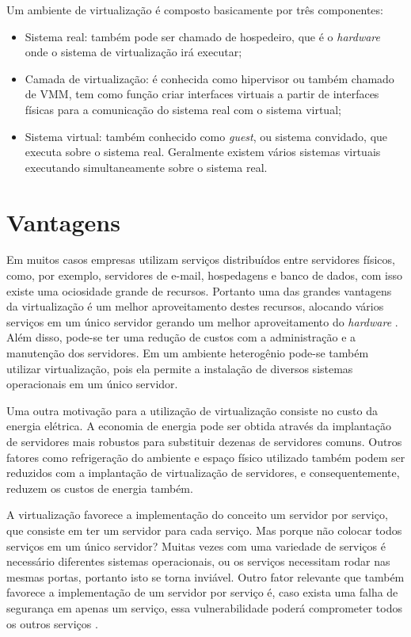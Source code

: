 Um ambiente de virtualização é composto basicamente por três componentes:
\begin{itemize}
 \item Sistema real: também pode ser chamado de hospedeiro, que é o \textit{hardware} onde o sistema de virtualização irá executar;
 \item Camada de virtualização: é conhecida como hipervisor ou também chamado de \ac{VMM}, tem como função criar interfaces virtuais a
 partir de interfaces físicas para a comunicação do sistema real com o sistema virtual;
 \item Sistema virtual: também conhecido como \textit{guest}, ou sistema convidado, que executa sobre o sistema real. Geralmente
 existem vários sistemas virtuais executando simultaneamente sobre o sistema real.
\end{itemize}

\section{Vantagens}
\label{section:vantagensvirt}

Em muitos casos empresas utilizam serviços distribuídos entre servidores físicos, como, por exemplo, servidores de e-mail, hospedagens e 
banco de dados, com isso existe uma ociosidade grande de recursos. Portanto uma das grandes vantagens da virtualização é um melhor 
aproveitamento destes recursos, alocando vários serviços em um único servidor gerando um melhor aproveitamento do \textit{hardware} 
\cite{moreira2006}. Além disso, pode-se ter uma redução de custos com a administração e a manutenção dos servidores. Em um ambiente 
heterogênio pode-se também utilizar virtualização, pois ela permite a instalação de diversos sistemas operacionais em um único servidor.

Uma outra motivação para a utilização de virtualização consiste no custo da energia elétrica. A economia de energia pode ser obtida através 
da implantação de servidores mais robustos para substituir dezenas de servidores comuns. Outros fatores como refrigeração do ambiente e 
espaço físico utilizado também podem ser reduzidos com a implantação de virtualização de servidores, e consequentemente, reduzem os 
custos de energia também.

A virtualização favorece a implementação do conceito um servidor por serviço, que consiste em ter um servidor para cada serviço.
Mas porque não colocar todos serviços em um único servidor? Muitas vezes com uma variedade de serviços é necessário diferentes 
sistemas operacionais, ou os serviços necessitam rodar nas mesmas portas, portanto isto se torna inviável. Outro fator relevante que 
também favorece a implementação de um servidor por serviço é, caso exista uma falha de segurança em apenas um serviço, essa 
vulnerabilidade poderá comprometer todos os outros serviços 
\cite{carissimi2008}.

